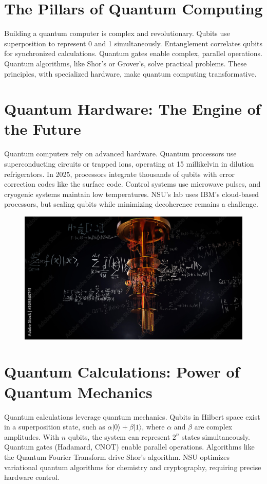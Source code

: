\documentclass[a4paper,10pt,twocolumn]{memoir}
\begin{document}
\section*{The Pillars of Quantum Computing}
Building a quantum computer is complex and revolutionary. Qubits use superposition to represent 0 and 1 simultaneously. Entanglement correlates qubits for synchronized calculations. Quantum gates enable complex, parallel operations. Quantum algorithms, like Shor's or Grover's, solve practical problems. These principles, with specialized hardware, make quantum computing transformative.


\section*{Quantum Hardware: The Engine of the Future}
Quantum computers rely on advanced hardware. Quantum processors use superconducting circuits or trapped ions, operating at 15 millikelvin in dilution refrigerators. In 2025, processors integrate thousands of qubits with error correction codes like the surface code. Control systems use microwave pulses, and cryogenic systems maintain low temperatures. NSU's lab uses IBM's cloud-based processors, but scaling qubits while minimizing decoherence remains a challenge.


\begin{figure}[ht]
  \centering
  \includegraphics[width=\columnwidth]{QC-2.png}
  \caption*{}
  \label{fig2}
\end{figure}


\section*{Quantum Calculations: Power of Quantum Mechanics}
Quantum calculations leverage quantum mechanics. Qubits in Hilbert space exist in a superposition state, such as $\alpha|0\rangle + \beta|1\rangle$, where $\alpha$ and $\beta$ are complex amplitudes. With $n$ qubits, the system can represent $2^n$ states simultaneously. Quantum gates (Hadamard, CNOT) enable parallel operations. Algorithms like the Quantum Fourier Transform drive Shor's algorithm. NSU optimizes variational quantum algorithms for chemistry and cryptography, requiring precise hardware control.
\end{document}
